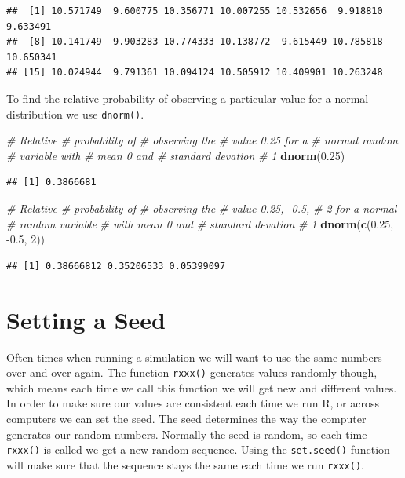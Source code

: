 \documentclass[
]{book}
\newenvironment{Shaded}{\begin{snugshade}}{\end{snugshade}}
\newcommand{\CommentTok}[1]{\textcolor[rgb]{0.56,0.35,0.01}{\textit{#1}}}
\newcommand{\DecValTok}[1]{\textcolor[rgb]{0.00,0.00,0.81}{#1}}
\newcommand{\FloatTok}[1]{\textcolor[rgb]{0.00,0.00,0.81}{#1}}
\newcommand{\KeywordTok}[1]{\textcolor[rgb]{0.13,0.29,0.53}{\textbf{#1}}}
\newcommand{\NormalTok}[1]{#1}
\begin{document}
\begin{verbatim}
##  [1] 10.571749  9.600775 10.356771 10.007255 10.532656  9.918810  9.633491
##  [8] 10.141749  9.903283 10.774333 10.138772  9.615449 10.785818 10.650341
## [15] 10.024944  9.791361 10.094124 10.505912 10.409901 10.263248
\end{verbatim}

To find the relative probability of observing a particular value for a normal distribution we use \texttt{dnorm()}.

\begin{Shaded}
\begin{Highlighting}[]
\CommentTok{# Relative}
\CommentTok{# probability of}
\CommentTok{# observing the}
\CommentTok{# value 0.25 for a}
\CommentTok{# normal random}
\CommentTok{# variable with}
\CommentTok{# mean 0 and}
\CommentTok{# standard devation}
\CommentTok{# 1}
\KeywordTok{dnorm}\NormalTok{(}\FloatTok{0.25}\NormalTok{)}
\end{Highlighting}
\end{Shaded}

\begin{verbatim}
## [1] 0.3866681
\end{verbatim}

\begin{Shaded}
\begin{Highlighting}[]
\CommentTok{# Relative}
\CommentTok{# probability of}
\CommentTok{# observing the}
\CommentTok{# value 0.25, -0.5,}
\CommentTok{# 2 for a normal}
\CommentTok{# random variable}
\CommentTok{# with mean 0 and}
\CommentTok{# standard devation}
\CommentTok{# 1}
\KeywordTok{dnorm}\NormalTok{(}\KeywordTok{c}\NormalTok{(}\FloatTok{0.25}\NormalTok{, }\FloatTok{-0.5}\NormalTok{, }\DecValTok{2}\NormalTok{))}
\end{Highlighting}
\end{Shaded}

\begin{verbatim}
## [1] 0.38666812 0.35206533 0.05399097
\end{verbatim}

\hypertarget{setting-a-seed}{%
\section{Setting a Seed}\label{setting-a-seed}}

Often times when running a simulation we will want to use the same numbers over and over again. The function \texttt{rxxx()} generates values randomly though, which means each time we call this function we will get new and different values. In order to make sure our values are consistent each time we run R, or across computers we can set the seed. The seed determines the way the computer generates our random numbers. Normally the seed is random, so each time \texttt{rxxx()} is called we get a new random sequence. Using the \texttt{set.seed()} function will make sure that the sequence stays the same each time we run \texttt{rxxx()}.
\end{document}
